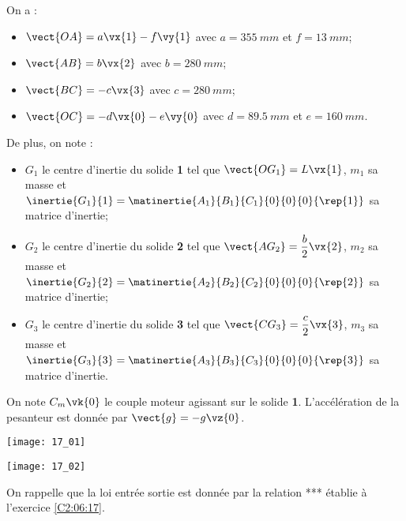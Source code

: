 \normalfalse \difficilefalse \tdifficiletrue
\correctionfalse


\setcounter{question}{0}%
\ifcorrection
\else
{}
\fi

\ifprof
\else
On a : 
\begin{itemize}
\item $\vect{OA} = a \vx{1}-f \vy{1}$ avec $a=\SI{355}{mm}$ et $f=\SI{13}{mm}$;
\item $\vect{AB} = b \vx{2}$ avec $b=\SI{280}{mm}$;
\item $\vect{BC} = -c \vx{3}$ avec $c=\SI{280}{mm}$;
\item $\vect{OC} = -d \vx{0}-e\vy{0}$ avec $d=\SI{89,5}{mm}$ et $e=\SI{160}{mm}$.
\end{itemize}
De plus, on note :
\begin{itemize}
\item $G_1$ le centre d'inertie du solide \textbf{1} tel que $\vect{OG_1}=L \vx{1}$, $m_1$ sa masse et $\inertie{G_1}{1}=\matinertie{A_1}{B_1}{C_1}{0}{0}{0}{\rep{1}}$ sa matrice d'inertie;
\item $G_2$ le centre d'inertie du solide \textbf{2} tel que $\vect{AG_2}=\dfrac{b}{2}\vx{2}$, $m_2$ sa masse et $\inertie{G_2}{2}=\matinertie{A_2}{B_2}{C_2}{0}{0}{0}{\rep{2}}$ sa matrice d'inertie;
\item $G_3$ le centre d'inertie du solide \textbf{3} tel que $\vect{CG_3}=\dfrac{c}{2}\vx{3}$, $m_3$ sa masse et $\inertie{G_3}{3}=\matinertie{A_3}{B_3}{C_3}{0}{0}{0}{\rep{3}}$ sa matrice d'inertie.
\end{itemize}
On note $C_m\vk{0}$ le couple moteur agissant sur le solide \textbf{1}. L'accélération de la pesanteur est donnée par $\vect{g}=-g\vz{0}$.

\begin{marginfigure}
\texttt{[image: 17\_01]}

\texttt{[image: 17\_02]}
\end{marginfigure}
\fi
On rappelle que la loi entrée sortie est donnée par la relation *** établie à l'exercice \ref{C2:06:17}.

